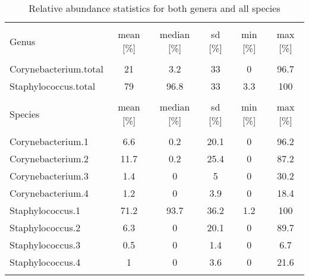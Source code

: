 
\begin{table*}[t] \centering 

\begin{tabular}{@{\extracolsep{5pt}} lccccc} 
\\[-1.8ex]\hline 
\hline \\[-1.8ex] 
Genus & mean [\%] & median [\%] & sd [\%] & min [\%] & max [\%]\\ 
\hline \\[-1.8ex] 
Corynebacterium.total & 21 & 3.2 & 33 & 0 & 96.7 \\ 
Staphylococcus.total & 79 & 96.8 & 33 & 3.3 & 100 \\ 
\hline\\
Species  & mean [\%] & median [\%] & sd [\%] & min [\%] & max [\%]\\ 
\hline \\
Corynebacterium.1 & 6.6 & 0.2 & 20.1 & 0 & 96.2 \\ 
Corynebacterium.2 & 11.7 & 0.2 & 25.4 & 0 & 87.2 \\ 
Corynebacterium.3 & 1.4 & 0 & 5 & 0 & 30.2 \\ 
Corynebacterium.4 & 1.2 & 0 & 3.9 & 0 & 18.4 \\ 
Staphylococcus.1 & 71.2 & 93.7 & 36.2 & 1.2 & 100 \\ 
Staphylococcus.2 & 6.3 & 0 & 20.1 & 0 & 89.7 \\ 
Staphylococcus.3 & 0.5 & 0 & 1.4 & 0 & 6.7 \\ 
Staphylococcus.4 & 1 & 0 & 3.6 & 0 & 21.6 \\ 
\hline \\[-1.8ex] 
\end{tabular} 
  \caption{Relative abundance statistics for both genera and all species\label{tab:BacteriaStatistics} } 
\end{table*} 
